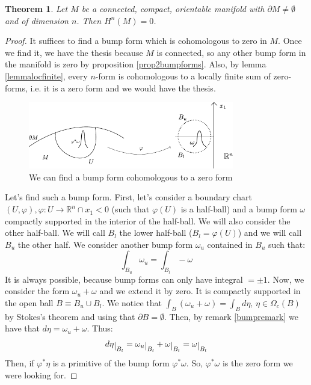 \documentclass[a4paper,11pt,titlepage, article, oneside]{memoir}
\numberwithin{equation}{section}
\newtheorem{theorem}{Theorem}[section]
\theoremstyle{definition}
\theoremstyle{remark}
\newcommand{\rfield}{\mathbb{R}}
\newcommand{\restrict}[2]{{#1}\raisebox{-.5ex}{$|$}_{#2}}
\begin{document}
\begin{theorem}
Let $M$ be a connected, compact, orientable manifold with $\partial M \not = \emptyset$ and of dimension $n$. Then $H^n(M) = 0$.
\end{theorem}
\begin{proof}
It suffices to find a bump form which is cohomologous to zero in $M$. Once we find it, we have the thesis because $M$ is connected, so any other bump form in the manifold is zero by proposition \ref{prop2bumpforms}. Also, by lemma \ref{lemmalocfinite}, every $n$-form is cohomologous to a locally finite sum of zero-forms, i.e. it is a zero form and we would have the thesis.
\begin{figure}[H] \label{Fig:bumpforms2}
     \centering
     \includegraphics[width=0.8\textwidth]{Images/bumpforms2.pdf} 
     \caption{We can find a bump form cohomologous to a zero form}      
\end{figure}
Let's find such a bump form. First, let's consider a boundary chart $(U, \varphi), \varphi \colon U \rightarrow \rfield^n \cap {x_1 < 0}$ (such that $\varphi(U)$ is a half-ball) and a bump form $\omega$ compactly supported in the interior of the half-ball. We will also consider the other half-ball. We will call $B_l$ the lower half-ball ($B_l = \varphi(U)$) and we will call $B_u$ the other half. We consider another bump form $\omega_u$ contained in $B_u$ such that:
$$\int_{B_u} \omega_u = \int_{B_l} - \omega$$
It is always possible, because bump forms can only have integral $=\pm 1$.
Now, we consider the form $\omega_u + \omega$ and we extend it by zero. It is compactly supported in the open ball $B \equiv B_u \cup B_l$. We notice that $\int_{B} (\omega_u + \omega) = \int_B d\eta, \, \eta \in \Omega_c(B)$ by Stokes's theorem and using that $\partial B =\emptyset$. Then, by remark \ref{bumpremark} we have that $d\eta = \omega_u + \omega$. Thus:
$$\restrict{d\eta}{B_l} = \restrict{\omega_u}{B_l} + \restrict{\omega}{B_l} = \restrict{\omega}{B_l}$$
Then, if $\varphi^* \eta$ is a primitive of the bump form $\varphi^* \omega$. So, $\varphi^* \omega$ is the zero form we were looking for.
\end{proof}
\end{document}
